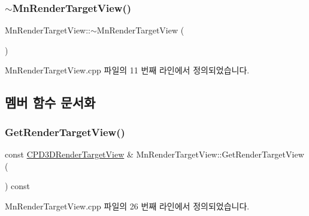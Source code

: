 \subsubsection{\texorpdfstring{$\sim$\+Mn\+Render\+Target\+View()}{~MnRenderTargetView()}}
{\footnotesize\ttfamily Mn\+Render\+Target\+View\+::$\sim$\+Mn\+Render\+Target\+View (\begin{DoxyParamCaption}{ }\end{DoxyParamCaption})}



Mn\+Render\+Target\+View.\+cpp 파일의 11 번째 라인에서 정의되었습니다.



\subsection{멤버 함수 문서화}
\mbox{\label{class_m_n_l_1_1_mn_render_target_view_a71de34bb20d238b13449b776a1d8572d}} 
\subsubsection{\texorpdfstring{Get\+Render\+Target\+View()}{GetRenderTargetView()}}
{\footnotesize\ttfamily const \hyperlink{namespace_m_n_l_aa08a7c0b5ac9d877dacb57b9306b7b8c}{C\+P\+D3\+D\+Render\+Target\+View} \& Mn\+Render\+Target\+View\+::\+Get\+Render\+Target\+View (\begin{DoxyParamCaption}{ }\end{DoxyParamCaption}) const}



Mn\+Render\+Target\+View.\+cpp 파일의 26 번째 라인에서 정의되었습니다.

\mbox{\label{class_m_n_l_1_1_mn_render_target_view_a4ca6cfdd184cec57e8a8d2e1c87e6bbb}} 
